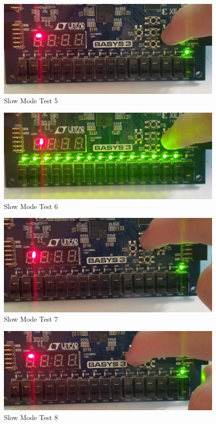 \documentclass[11pt]{article}
\begin{document}
\begin{figure}[ht]\centering
\includegraphics[width=1.0\textwidth,trim=0 0mm 0 0,clip]{Slow5}
\caption{Slow Mode Test 5}
\end{figure}
\begin{figure}[ht]\centering
\includegraphics[width=1.0\textwidth,trim=0 0mm 0 0,clip]{Slow6}
\caption{Slow Mode Test 6}
\end{figure}
\begin{figure}[ht]\centering
\includegraphics[width=1.0\textwidth,trim=0 0mm 0 0,clip]{Slow7}
\caption{Slow Mode Test 7}
\end{figure}
\begin{figure}[ht]\centering
\includegraphics[width=1.0\textwidth,trim=0 0mm 0 0,clip]{Slow8}
\caption{Slow Mode Test 8}
\end{figure}
\end{document}
